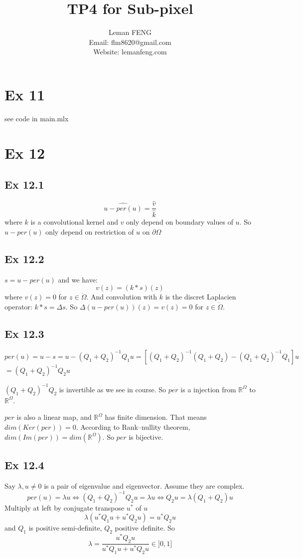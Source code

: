 \documentclass{article}
\title{TP4 for Sub-pixel}
\author{Leman FENG\\ Email: flm8620@gmail.com\\Website: lemanfeng.com}
\begin{document}
	\maketitle
	\section{Ex 11}
	see code in main.mlx
	
	\section{Ex 12}
	\subsection{Ex 12.1}
	$$
	\widehat{u-per(u)} = \frac{\hat{v}}{\hat{k}}
	$$
	where $k$ is a convolutional kernel and $v$ only depend on boundary values of $u$. So $u-per(u)$ only depend on restriction of $u$ on $\partial \Omega$
	\subsection{Ex 12.2}
	$s=u-per(u)$ and we have:
	$$
	v(z) = (k*s)(z)
	$$
	where $v(z)=0$ for $z\in \mathring{\Omega}$. And convolution with $k$ is the discret Laplacien operator: $k*s = \Delta s$. So $\Delta (u-per(u))(z) = v(z) = 0$ for $z\in \mathring{\Omega}$.
	\subsection{Ex 12.3}
	$per(u)=u-s=u-(Q_1+Q_2)^{-1}Q_1u = [(Q_1+Q_2)^{-1}(Q_1+Q_2) - (Q_1+Q_2)^{-1}Q_1]u$
	$=(Q_1+Q_2)^{-1}Q_2u$
	
	$(Q_1+Q_2)^{-1}Q_2$ is invertible as we see in course. So $per$ is a injection from $\mathbb{R}^\Omega$ to $\mathbb{R}^\Omega$. 
	
	$per$ is also a linear map, and $\mathbb{R}^\Omega$ has finite dimension. That means $dim(Ker(per)) = 0$. According to Rank–nullity theorem, $dim(Im(per))=dim(\mathbb{R}^\Omega)$. So $per$ is bijective.
	\subsection{Ex 12.4}
	Say $\lambda, u\neq0$ is a pair of eigenvalue and eigenvector. Assume they are complex.
	$$
	per(u)=\lambda u \Leftrightarrow (Q_1+Q_2)^{-1}Q_2u = \lambda u
	\Leftrightarrow Q_2 u = \lambda (Q_1+Q_2) u
	$$
	Multiply at left by conjugate transpose $u^*$ of $u$
	$$
	\lambda (u^*Q_1u +u^*Q_2u) = u^*Q_2u
	$$
	and $Q_1$ is positive semi-definite, $Q_2$ positive definite. So
	$$
	\lambda = \frac{u^*Q_2u}{u^*Q_1u +u^*Q_2u} \in ]0,1]
	$$
\end{document}
